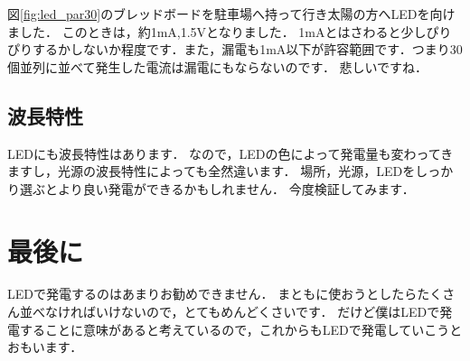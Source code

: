 \newpage
図\ref{fig:led_par30}のブレッドボードを駐車場へ持って行き太陽の方へLEDを向けました．
このときは，約1\si{\milli\ampere},1.5$\si\volt$となりました．
1\si{\milli\ampere}とはさわると少しぴりぴりするかしないか程度です．また，漏電も1\si{\milli\ampere}以下が許容範囲です．つまり30個並列に並べて発生した電流は漏電にもならないのです．
悲しいですね．


\subsection{波長特性}
LEDにも波長特性はあります．
なので，LEDの色によって発電量も変わってきますし，光源の波長特性によっても全然違います．
場所，光源，LEDをしっかり選ぶとより良い発電ができるかもしれません．
今度検証してみます．

\section{最後に}
LEDで発電するのはあまりお勧めできません．
まともに使おうとしたらたくさん並べなければいけないので，とてもめんどくさいです．
だけど僕はLEDで発電することに意味があると考えているので，これからもLEDで発電していこうとおもいます．
